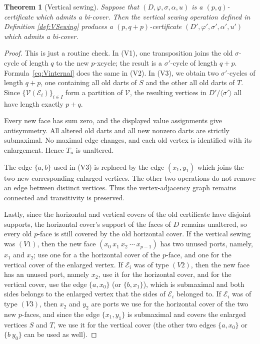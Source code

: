 \documentclass[11pt]{article}
\newtheorem{theorem}{Theorem}[section]
\theoremstyle{remark}
\newcommand{\cV}{\mathcal V}
\newcommand{\cE}{\mathcal E}
\begin{document}
\begin{theorem}[Vertical sewing]\label{thm:V} Suppose that $(D,\varphi, \sigma,\alpha, u)$ is a $(p,q)$-certificate which admits a bi-cover. Then the vertical sewing operation defined in Definition \ref{def:VSewing} produces a $(p,q+p)$-certificate $(D',\varphi', \sigma',\alpha', u')$ which admits a bi-cover.
\end{theorem}
\begin{proof} This is just a routine check. In (V1), one transposition joins the old
$\sigma$-cycle of length $q$ to the new $p$-xcycle; the result is a $\sigma'$-cycle of length $q+p$.  Formula~\eqref{eq:Vinternal} does the same in
(V2).  In (V3), we obtain two $\sigma'$-cycles of length $q+p$, one containing
all old darts of $S$ and the other all old darts of $T$.  Since $\{\cV(\cE_i)\}_{i\in I}$ form a partition of $\cV$, the resulting vertices in $D'/ \langle \sigma'\rangle $ all have length exactly $p+q$.

Every new face has sum zero, and the displayed value assignments give
antisymmetry.  All altered old darts and all new nonzero darts are strictly
submaximal.  No maximal edge changes, and each old vertex
is identified with its enlargement.  Hence $T_u$ is
unaltered. %

The edge $\{a,b\}$ used in (V3) is replaced by the edge
$(x_1,y_1)$ which joins the two new corresponding enlarged vertices.  The other two operations do not remove an edge between distinct
vertices. Thus the vertex-adjacency graph remains connected and transitivity
is preserved.

Lastly, since the horizontal and vertical covers of the old certificate have disjoint supports, the horizontal cover's support of the faces of $D$ remains unaltered, so every old $p$-face is still covered by the old horizontal cover. If the vertical sewing was $(V1)$, then the new face $(x_0\ x_1\ x_2\ \cdots\ x_{p-1})$ has two unused ports, namely, $x_1$ and $x_2$; use one for a the horizontal cover of the $p$-face, and one for the vertical cover of the enlarged vertex. If $\cE_i$ was of type  $(V2)$, then the new face has an unused port, namely $x_2$, use it for the horizontal cover, and for the vertical cover, use the edge $\{a, x_0\}$ (or $\{b, x_1\}$), which is submaximal and both sides belongs to the enlarged vertex that the sides of $\cE_i$ belonged to. If $\cE_i$ was of type $(V3)$, then $x_2$ and $y_2$ are ports we use for the horizontal cover of the two new $p$-faces, and since the edge $\{x_1, y_1\}$ is submaximal and covers the enlarged vertices $S$ and $T$, we use it for the vertical cover (the other two edges $\{a,x_0\}$ or $\{b\ y_0\}$ can be used as well). 
\end{proof}
\end{document}

